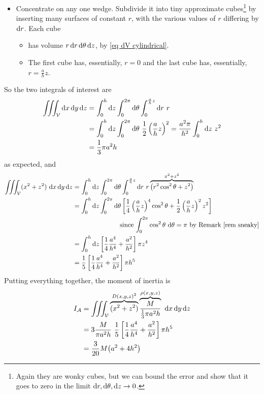 \begin{eg}
\begin{itemize}
\item 
Concentrate on any one wedge. Subdivide it into tiny approximate 
cubes\footnote{Again they are wonky cubes, but we can bound the error
and show that it goes to zero in the limit $\mathrm{d}r,\mathrm{d}\theta,\mathrm{d}z
\rightarrow 0$. }
by inserting many surfaces of constant $r$, with the various values of $r$ differing by $\mathrm{d}r$.  Each cube 
\vspace{-\topsep}
\begin{itemize} \itemsep1pt \parskip0pt 
\item
has volume $r\,\mathrm{d}r\,\mathrm{d}\theta\,\mathrm{d}z$, by \eqref{eq dV cylindrical}.
\item 
The first cube has, essentially, $r=0$ and the last cube has,
essentially, $r=\frac{a}{h}z$. 
\end{itemize}
\vspace{-\topsep}
\end{itemize}
So the two integrals of interest are
\begin{align*}
\tripInt_\cV \dee{x}\,\dee{y}\,\dee{z}
&=\int_0^h\dee{z}\int_0^{2\pi}\dee{\theta}\int_0^{\frac{a}{h}z}\dee{r}\ r \\
&=\int_0^h\dee{z}\int_0^{2\pi}\dee{\theta}\ 
                   \frac{1}{2}\left(\frac{a}{h}z\right)^2
=\frac{a^2\pi}{h^2}\int_0^h\dee{z}\ z^2 \\
&=\frac{1}{3}\pi a^2 h
\end{align*}
as expected, and
\begin{align*}
\iiint_{\mathcal{V}} (x^2+z^2)\ \mathrm{d}x\,\mathrm{d}y\,\mathrm{d}z
&=\int_0^h\mathrm{d}z\int_0^{2\pi}\mathrm{d}\theta\int_0^{\frac{a}{h}z}\mathrm{d}r\ r
   \overbrace{\big(r^2\cos^2\theta+z^2\big)}^{x^2+z^2} \\
&=\int_0^h\mathrm{d}z\int_0^{2\pi}\mathrm{d}\theta\left[
      \frac{1}{4}\left(\frac{a}{h}z\right)^4\cos^2\theta
       +\frac{1}{2}\left(\frac{a}{h}z\right)^2z^2\right] \\
&\hskip1in\text{since $\int_0^{2\pi}\cos^2\theta\ \mathrm{d}\theta=\pi$
                 by Remark \ref{rem sneaky}} \\
&=\int_0^h\mathrm{d}z\left[
      \frac{1}{4}\frac{a^4}{h^4}
       +\frac{a^2}{h^2}\right]\pi z^4\\
&=\frac{1}{5}\left[
      \frac{1}{4}\frac{a^4}{h^4}
       +\frac{a^2}{h^2}\right]\pi h^5 
\end{align*}
Putting everything together, the moment of inertia is
\begin{align*}
I_{\mathcal{A}}
&=\iiint_{\mathcal{V}} \overbrace{(x^2+z^2)}^{D(x,y,z)^2}
              \overbrace{\frac{M}{\frac{1}{3}\pi a^2h}}^{\rho(x,y,z)}
             \ \mathrm{d}x\,\mathrm{d}y\,\mathrm{d}z \\
&=3\frac{M}{\pi a^2h} \ \frac{1}{5}\left[
      \frac{1}{4}\frac{a^4}{h^4}
       +\frac{a^2}{h^2}\right]\pi h^5 \\
&=\frac{3}{20} M\big(a^2+4h^2\big)
\end{align*}







\end{eg}


